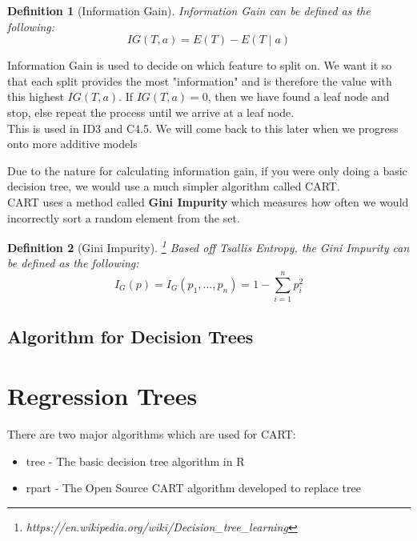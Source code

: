 \documentclass[11pt,a4paper]{report}
\newtheorem{definition}{Definition}
\begin{document}
\begin{definition}[Information Gain]
Information Gain can be defined as the following:
\begin{equation}
    IG(T,a) = E(T) - E(T \mid a)
\end{equation}
\end{definition}
Information Gain is used to decide on which feature to split on. We want it so that each split provides the most "information" and is therefore the value with this highest $IG(T,a)$. If $IG(T,a) = 0$, then we have found a leaf node and stop, else repeat the process until we arrive at a leaf node.\\
This is used in ID3 and C4.5. We will come back to this later when we progress onto more additive models

\medskip
Due to the nature for calculating information gain, if you were only doing a basic decision tree, we would use a much simpler algorithm called CART.\\
CART uses a method called \textbf{Gini Impurity} which measures how often we would incorrectly sort a random element from the set. 

\begin{definition}[Gini Impurity]\footnote{https://en.wikipedia.org/wiki/Decision\_tree\_learning}
Based off Tsallis Entropy, the Gini Impurity can be defined as the following:
\begin{equation}
    I_G (p) = I_G (p_1, \dots, p_n) = 1 - \sum_{i=1}^{n} p_i^2
\end{equation}
\end{definition} \cite[Metrics]{TreeWiki}

\subsection{Algorithm for Decision Trees}



\section{Regression Trees}
There are two major algorithms which are used for CART:

\begin{itemize}
    \item tree \cite{tree} - The basic decision tree algorithm in R
    \item rpart \cite{rpart} - The Open Source CART algorithm developed to replace tree
\end{itemize}
\end{document}
